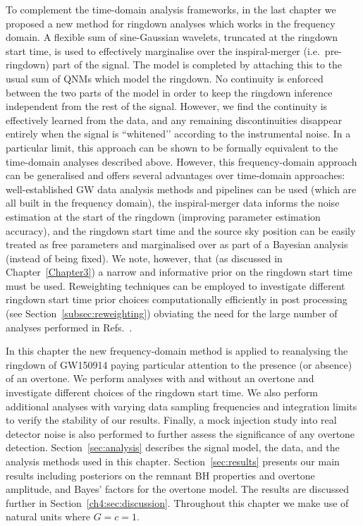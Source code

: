 To complement the time-domain analysis frameworks, in the last chapter we proposed a new method for ringdown analyses which works in the frequency domain.
A flexible sum of sine-Gaussian wavelets, truncated at the ringdown start time, is used to effectively marginalise over the inspiral-merger (i.e.\ pre-ringdown) part of the signal.
The model is completed by attaching this to the usual sum of QNMs which model the ringdown.
No continuity is enforced between the two parts of the model in order to keep the ringdown inference independent from the rest of the signal.
However, we find the continuity is effectively learned from the data, and any remaining discontinuities disappear entirely when the signal is ``whitened’’ according to the instrumental noise.
In a particular limit, this approach can be shown to be formally equivalent to the time-domain analyses described above.
However, this frequency-domain approach can be generalised and offers several advantages over time-domain approaches:
well-established GW data analysis methods and pipelines can be used (which are all built in the frequency domain), 
the inspiral-merger data informs the noise estimation at the start of the ringdown (improving parameter estimation accuracy), 
and the ringdown start time and the source sky position can be easily treated as free parameters and marginalised over as part of a Bayesian analysis (instead of being fixed).
We note, however, that (as discussed in Chapter~\ref{Chapter3}) a narrow and informative prior on the ringdown start time must be used.
Reweighting techniques can be employed to investigate different ringdown start time prior choices computationally efficiently in post processing (see Section~\ref{subsec:reweighting}) obviating the need for the large number of analyses performed in Refs.~\cite{Cotesta:2022pci, Isi:2022mhy}.

In this chapter the new frequency-domain method is applied to reanalysing the ringdown of GW150914 paying particular attention to the presence (or absence) of an overtone. 
We perform analyses with and without an overtone and investigate different choices of the ringdown start time. 
We also perform additional analyses with varying data sampling frequencies and integration limits to verify the stability of our results. Finally, a mock injection study into real detector noise is also performed to further assess the significance of any overtone detection.
Section~\ref{sec:analysis} describes the signal model, the data, and the analysis methods used in this chapter.
Section~\ref{sec:results} presents our main results including posteriors on the remnant BH properties and overtone amplitude, and Bayes' factors for the overtone model.
The results are discussed further in Section~\ref{ch4:sec:discussion}.
Throughout this chapter we make use of natural units where $G=c=1$.

